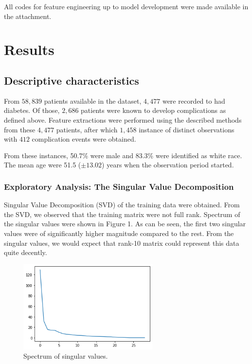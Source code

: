 \documentclass{article}
\begin{document}
All codes for feature engineering up to model development were made available in the attachment.

\section{Results}
\label{result}

\subsection{Descriptive characteristics}

From $58,839$ patients available in the dataset, $4,477$ were recorded to had diabetes. Of those, $2,686$ patients were known to develop complications as defined above. Feature extractions were performed using the described methods from these $4,477$ patients, after which $1,458$ instance of distinct observations with $412$ complication events were obtained.

From these instances, 50.7\% were male and 83.3\% were identified as white race. The mean age were 51.5 ($\pm 13.02$) years when the observation period started.

\subsubsection{Exploratory Analysis: The Singular Value Decomposition}

Singular Value Decomposition (SVD) of the training data were obtained. From the SVD, we observed that the training matrix were not full rank. Spectrum of the singular values were shown in Figure 1. As can be seen, the first two singular values were of significantly higher magnitude compared to the rest. From the singular values, we would expect that rank-10 matrix could represent this data quite decently.

\begin{figure}
  \centering
  \includegraphics[width=7cm]{svd.png}
  \caption{Spectrum of singular values.}
\end{figure}
\end{document}
